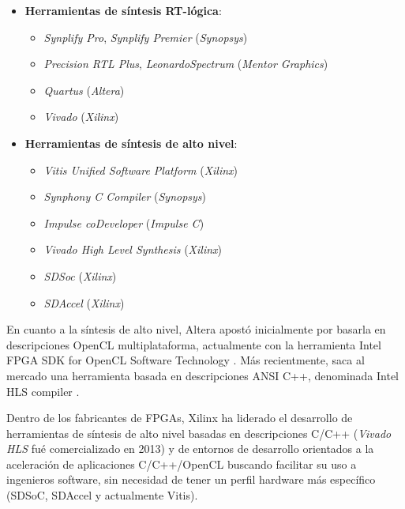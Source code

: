 \begin{itemize}
    \item \textbf{Herramientas de síntesis RT-lógica}:
        \begin{itemize}
            \item \textit{Synplify Pro}, \textit{Synplify Premier} (\textit{Synopsys}) \cite{synopsis}
            \item \textit{Precision RTL Plus}, \textit{LeonardoSpectrum} (\textit{Mentor Graphics}) \cite{mentor}
            \item \textit{Quartus} (\textit{Altera}) \cite{quartus}
            \item \textit{Vivado} (\textit{Xilinx}) \cite{vivado1}
        \end{itemize}
    \item \textbf{Herramientas de síntesis de alto nivel}:
        \begin{itemize}
            \item \textit{Vitis Unified Software Platform} (\textit{Xilinx}) \cite{vitis}
            \item \textit{Synphony C Compiler} (\textit{Synopsys})
            \item \textit{Impulse coDeveloper} (\textit{Impulse C})
            \item \textit{Vivado High Level Synthesis} (\textit{Xilinx})
            \item \textit{SDSoc} (\textit{Xilinx})
            \item \textit{SDAccel} (\textit{Xilinx})
        \end{itemize}
\end{itemize}

En cuanto a la síntesis de alto nivel, Altera apostó inicialmente por basarla en descripciones OpenCL multiplataforma, actualmente con la 
herramienta Intel FPGA SDK for OpenCL Software Technology \cite{intelsdk}. Más recientmente, saca al mercado una herramienta basada en 
descripciones ANSI C++, denominada Intel HLS compiler \cite{intelhls}.

Dentro de los fabricantes de FPGAs, Xilinx ha liderado el desarrollo de herramientas de síntesis de alto nivel basadas en descripciones 
C/C++ (\textit{Vivado HLS}  fué comercializado en 2013) y de entornos de desarrollo orientados a la aceleración de aplicaciones C/C++/OpenCL 
buscando facilitar su uso a ingenieros software, sin necesidad de tener un perfil hardware más específico (SDSoC, SDAccel y actualmente Vitis).

